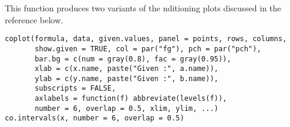 %
\begin{Description}\relax
This function produces two variants of the nditioning plots
discussed in the reference below.
\end{Description}
%
\begin{Usage}
\begin{verbatim}
coplot(formula, data, given.values, panel = points, rows, columns,
       show.given = TRUE, col = par("fg"), pch = par("pch"), 
       bar.bg = c(num = gray(0.8), fac = gray(0.95)),
       xlab = c(x.name, paste("Given :", a.name)),
       ylab = c(y.name, paste("Given :", b.name)),
       subscripts = FALSE,
       axlabels = function(f) abbreviate(levels(f)),
       number = 6, overlap = 0.5, xlim, ylim, ...) 
co.intervals(x, number = 6, overlap = 0.5)
\end{verbatim}
\end{Usage}
%
